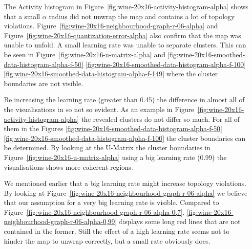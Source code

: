 \documentclass{acm_proc_article-sp}
\begin{document}
The Activity histogram in Figure~\ref{fig:wine-20x16-activity-histogram-alpha} shows that a small $\alpha$ radius did not unwrap the map and contains
a lot of topology violations. Figure~\ref{fig:wine-20x16-neighbourhood-graph-r-06-alpha} and Figure~\ref{fig:wine-20x16-quantization-error-alpha} also confirm that the map was unable to unfold.
A small learning rate was unable to separate clusters. This can be seen in Figure~\ref{fig:wine-20x16-u-matrix-alpha}
and
\ref{fig:wine-20x16-smoothed-data-histogram-alpha-f-50}
\ref{fig:wine-20x16-smoothed-data-histogram-alpha-f-100}
\ref{fig:wine-20x16-smoothed-data-histogram-alpha-f-149}
where the cluster boundaries are not visible.

Be increasing the learning rate (greater than 0.45) the difference in almost all of the visualisations in so not so evident.
As an example in Figure~\ref{fig:wine-20x16-activity-histogram-alpha} the revealed clusters do not differ so much. For all of 
them in the Figures
\ref{fig:wine-20x16-smoothed-data-histogram-alpha-f-50}
\ref{fig:wine-20x16-smoothed-data-histogram-alpha-f-100}
the cluster boundaries can be determined. By looking at the U-Matrix the cluster boundaries in Figure~\ref{fig:wine-20x16-u-matrix-alpha}
using a big learning rate (0.99) the visualisations shows more coherent regions.

We mentioned earlier that a big learning rate might increase topology violations.
By looking at Figure~\ref{fig:wine-20x16-neighbourhood-graph-r-06-alpha} we believe that our assumption for
a very big learning rate is visible. Compared to Figure~\ref{fig:wine-20x16-neighbourhood-graph-r-06-alpha-0,7},
\ref{fig:wine-20x16-neighbourhood-graph-r-06-alpha-0,99} displays some long red lines that are not contained in the former.
Still the effect of a high learning rate seems not to hinder the map to unwrap correctly, but a small rate obviously does.
\end{document}
